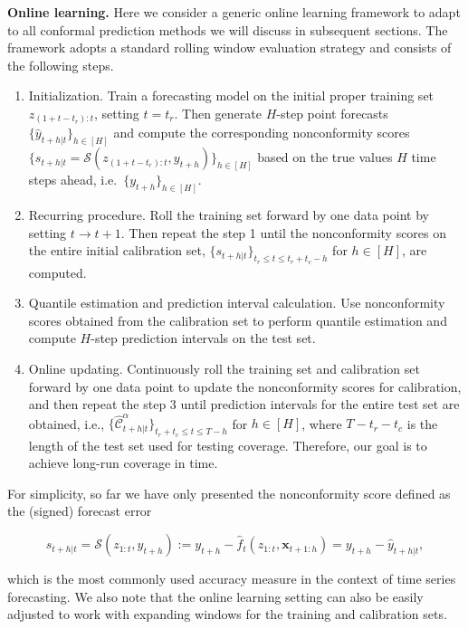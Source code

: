 \documentclass[
  11pt,
  a4paper,
]{article}
\theoremstyle{plain}
\theoremstyle{plain}
\theoremstyle{remark}
\begin{document}
\textbf{Online learning.} Here we consider a generic online learning
framework to adapt to all conformal prediction methods we will discuss
in subsequent sections. The framework adopts a standard rolling window
evaluation strategy and consists of the following steps.

\begin{enumerate}
\def\labelenumi{\arabic{enumi}.}
\item
  Initialization. Train a forecasting model on the initial proper
  training set \(z_{(1+t-t_r):t}\), setting \(t=t_r\). Then generate
  \(H\)-step point forecasts \(\{\hat{y}_{t+h|t}\}_{h\in[H]}\) and
  compute the corresponding nonconformity scores
  \(\{s_{t+h|t}=\mathcal{S}(z_{(1+t-t_r):t}, y_{t+h})\}_{h\in[H]}\)
  based on the true values \(H\) time steps ahead,
  i.e.~\(\{y_{t+h}\}_{h\in[H]}\).
\item
  Recurring procedure. Roll the training set forward by one data point
  by setting \(t \rightarrow t+1\). Then repeat the step 1 until the
  nonconformity scores on the entire initial calibration set,
  \(\{s_{t+h|t}\}_{t_r \leq t \leq t_r+t_c-h}\) for \(h\in[H]\), are
  computed.
\item
  Quantile estimation and prediction interval calculation. Use
  nonconformity scores obtained from the calibration set to perform
  quantile estimation and compute \(H\)-step prediction intervals on the
  test set.
\item
  Online updating. Continuously roll the training set and calibration
  set forward by one data point to update the nonconformity scores for
  calibration, and then repeat the step 3 until prediction intervals for
  the entire test set are obtained, i.e.,
  \(\{\hat{\mathcal{C}}_{t+h|t}^{\alpha}\}_{t_r+t_c \leq t \leq T-h}\)
  for \(h \in [H]\), where \(T-t_r-t_c\) is the length of the test set
  used for testing coverage. Therefore, our goal is to achieve long-run
  coverage in time.
\end{enumerate}

For simplicity, so far we have only presented the nonconformity score
defined as the (signed) forecast error

\[
s_{t+h|t}=\mathcal{S}\left(z_{1:t}, y_{t+h}\right):=y_{t+h}-\hat{f}_t\left(z_{1:t},\bm{x}_{t+1:h}\right)=y_{t+h}-\hat{y}_{t+h|t},
\]

which is the most commonly used accuracy measure in the context of time
series forecasting. We also note that the online learning setting can
also be easily adjusted to work with expanding windows for the training
and calibration sets.
\end{document}
